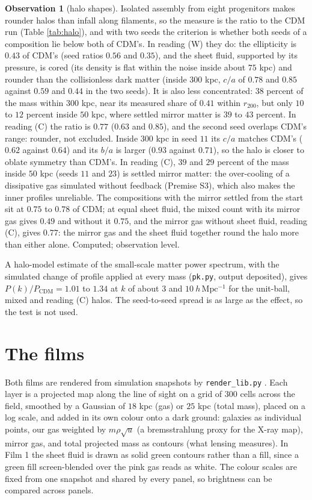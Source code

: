 \documentclass[11pt]{article}
\theoremstyle{definition}
\newtheorem{observation}[theorem]{Observation}
\newcommand{\file}[1]{\texttt{#1}}
\begin{document}
\begin{observation}[halo shapes]\label{obs:halo}
Isolated assembly from eight progenitors makes rounder halos than infall along filaments, so the measure is the ratio to the CDM run (Table \ref{tab:halo}), and with two seeds the criterion is whether both seeds of a composition lie below both of CDM's. In reading (W) they do: the ellipticity is $0.43$ of CDM's (seed ratios $0.56$ and $0.35$), and the sheet fluid, supported by its pressure, is cored (its density is flat within the noise inside about $75$ kpc) and rounder than the collisionless dark matter (inside $300$ kpc, $c/a$ of $0.78$ and $0.85$ against $0.59$ and $0.44$ in the two seeds). It is also less concentrated: $38$ percent of the mass within $300$ kpc, near its measured share of $0.41$ within $r_{200}$, but only $10$ to $12$ percent inside $50$ kpc, where settled mirror matter is $39$ to $43$ percent. In reading (C) the ratio is $0.77$ ($0.63$ and $0.85$), and the second seed overlaps CDM's range: rounder, not excluded. Inside $300$ kpc in seed $11$ its $c/a$ matches CDM's ($0.62$ against $0.64$) and its $b/a$ is larger ($0.93$ against $0.71$), so the halo is closer to oblate symmetry than CDM's. In reading (C), $39$ and $29$ percent of the mass inside $50$ kpc (seeds $11$ and $23$) is settled mirror matter: the over-cooling of a dissipative gas simulated without feedback (Premise S3), which also makes the inner profiles unreliable. The compositions with the mirror settled from the start sit at $0.75$ to $0.78$ of CDM; at equal sheet fluid, the mixed count with its mirror gas gives $0.49$ and without it $0.75$, and the mirror gas without sheet fluid, reading (C), gives $0.77$: the mirror gas and the sheet fluid together round the halo more than either alone. Computed; observation level.
\end{observation}

A halo-model estimate of the small-scale matter power spectrum, with the simulated change of profile applied at every mass (\file{pk.py}, output deposited), gives $P(k)/P_{\mathrm{CDM}} = 1.01$ to $1.34$ at $k$ of about $3$ and $10\ h\,\mathrm{Mpc^{-1}}$ for the unit-ball, mixed and reading (C) halos. The seed-to-seed spread is as large as the effect, so the test is not used.

\section{The films}\label{sec:films}

Both films are rendered from simulation snapshots by \file{render\_lib.py} \cite{ButlerSuppT14b}. Each layer is a projected map along the line of sight on a grid of $300$ cells across the field, smoothed by a Gaussian of $18$ kpc (gas) or $25$ kpc (total mass), placed on a log scale, and added in its own colour onto a dark ground: galaxies as individual points, our gas weighted by $m\rho\sqrt{u}$ (a bremsstrahlung proxy for the X-ray map), mirror gas, and total projected mass as contours (what lensing measures). In Film 1 the sheet fluid is drawn as solid green contours rather than a fill, since a green fill screen-blended over the pink gas reads as white. The colour scales are fixed from one snapshot and shared by every panel, so brightness can be compared across panels.
\end{document}
